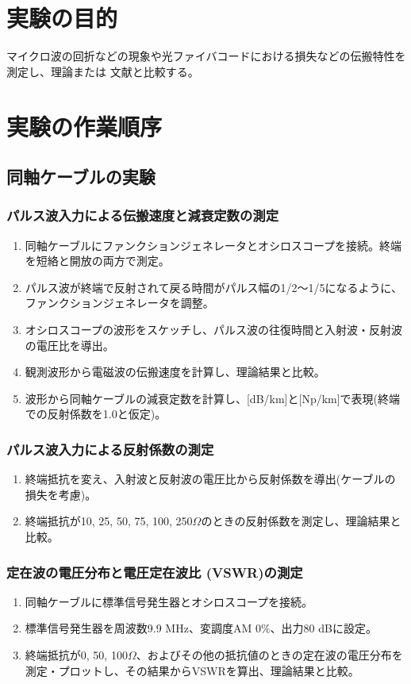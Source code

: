 \documentclass[a4paper,11pt,xelatex,ja=standard]{bxjsarticle}
\begin{document}
\section{実験の目的}
    マイクロ波の回折などの現象や光ファイバコードにおける損失などの伝搬特性を測定し、理論または 文献と比較する。

\section{実験の作業順序}
    \subsection{同軸ケーブルの実験}
        \subsubsection{パルス波入力による伝搬速度と減衰定数の測定}
            \begin{enumerate}
                \item 同軸ケーブルにファンクションジェネレータとオシロスコープを接続。終端を短絡と開放の両方で測定。
                \item パルス波が終端で反射されて戻る時間がパルス幅の1/2〜1/5になるように、ファンクションジェネレータを調整。
                \item オシロスコープの波形をスケッチし、パルス波の往復時間と入射波・反射波の電圧比を導出。
                \item 観測波形から電磁波の伝搬速度を計算し、理論結果と比較。
                \item 波形から同軸ケーブルの減衰定数を計算し、[dB/km]と[Np/km]で表現(終端での反射係数を1.0と仮定)。
            \end{enumerate}

        \subsubsection{パルス波入力による反射係数の測定}
            \begin{enumerate}
                \item 終端抵抗を変え、入射波と反射波の電圧比から反射係数を導出(ケーブルの損失を考慮)。
                \item 終端抵抗が10, 25, 50, 75, 100, 250$\Omega$のときの反射係数を測定し、理論結果と比較。
            \end{enumerate}

        \subsubsection{定在波の電圧分布と電圧定在波比 (VSWR)の測定}
            \begin{enumerate}
                \item 同軸ケーブルに標準信号発生器とオシロスコープを接続。
                \item 標準信号発生器を周波数9.9 MHz、変調度AM 0$\%$、出力80 dBに設定。
                \item 終端抵抗が0, 50, 100$\Omega$、およびその他の抵抗値のときの定在波の電圧分布を測定・プロットし、その結果からVSWRを算出、理論結果と比較。
            \end{enumerate}
\end{document}
